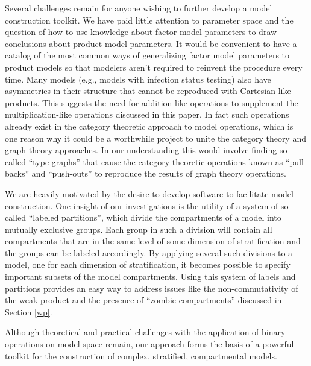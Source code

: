 Several challenges remain for anyone wishing to further develop a model construction toolkit. We have paid little attention to parameter space and the question of how to use knowledge about factor model parameters to draw conclusions about product model parameters. It would be convenient to have a catalog of the most common ways of generalizing factor model parameters to product models so that modelers aren't required to reinvent the procedure every time. Many models (e.g., models with infection status testing) also have asymmetries in their structure that cannot be reproduced with Cartesian-like products. This suggests the need for addition-like operations to supplement the multiplication-like operations discussed in this paper. In fact such operations already exist in the category theoretic approach to model operations, which is one reason why it could be a worthwhile project to unite the category theory and graph theory approaches. In our understanding this would involve finding so-called ``type-graphs'' that cause the category theoretic operations known as ``pull-backs'' and ``push-outs'' to  reproduce the results of graph theory operations.
\citep{fong2018seven, Libkind2022an, libkind2021operadic, baez2022compositional, baez2017compositional}

We are heavily motivated by the desire to develop software to facilitate model construction. One insight of our investigations is the utility of a system of so-called ``labeled partitions'', which divide the compartments of a model into mutually exclusive groups. Each group in such a division will contain all compartments that are in the same level of some dimension of stratification and the groups can be labeled accordingly. By applying several such divisions to a model, one for each dimension of stratification, it becomes possible to specify important subsets of the model compartments. Using this system of labels and partitions provides an easy way to address issues like the non-commutativity of the weak product and the presence of ``zombie compartments'' discussed in Section \ref{wp}.

Although theoretical and practical challenges with the application of binary operations on model space remain, our approach forms the basis of a powerful toolkit for the construction of complex, stratified, compartmental models.
